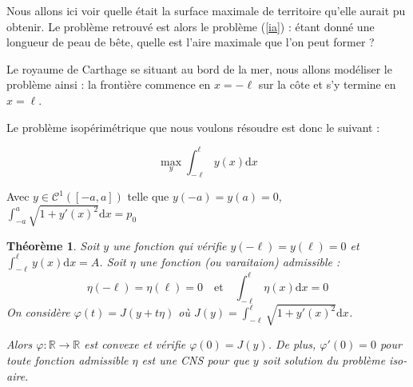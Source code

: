 \documentclass[10pt,a4paper]{article}
\newcommand{\R}{\mathbb{R}}
\newcommand{\C}{\mathcal{C}}
\renewcommand{\d}{\mathrm{d}}
\renewcommand{\phi}{\varphi}
\theoremstyle{plain}
\newtheorem{thm}{Théorème}[section]
\theoremstyle{definition}
\begin{document}
Nous allons ici voir quelle était la surface maximale de territoire qu'elle aurait pu obtenir. Le problème retrouvé est alors le problème (\ref{ia}) : étant donné une longueur de peau de bête, quelle est l'aire maximale que l'on peut former ?


Le royaume de Carthage se situant au bord de la mer, nous allons modéliser le problème ainsi : la frontière commence en $x=-\ell$ sur la côte et s'y termine en $x=\ell$.

\begin{center}


\end{center}



Le problème isopérimétrique que nous voulons résoudre est donc le suivant :

\[\max_{y}\int_{-\ell}^\ell y(x)\d x\]

Avec $y\in\C^1([-a,a])$ telle que $y(-a)=y(a)=0$, $\int_{-a}^a\sqrt{1+y'(x)^2}\d x=p_0$





\begin{thm}
Soit $y$ une fonction qui vérifie $y(-\ell)=y(\ell)=0$ et $\displaystyle\int_{-\ell}^{\ell}y(x)\d x=A$. Soit $\eta$ une fonction (ou \emph{varaitaion}) \emph{admissible} :
\[\eta(-\ell)=\eta(\ell)=0\quad \text{et}\quad\int_{-\ell}^{\ell}\eta(x)\d x=0\]
On considère $\phi(t)=J(y+t\eta)$ où $J(y)=\displaystyle\int_{-\ell}^{\ell}\sqrt{1+y'(x)^2}\d x$.

Alors $\phi\colon\R\to\R$ est convexe et vérifie $\phi(0)=J(y)$. De plus, $\phi'(0)=0$ pour toute fonction admissible $\eta$ est une CNS pour que $y$ soit solution du problème iso-aire.
\end{thm}
\end{document}
